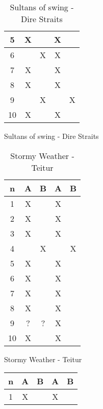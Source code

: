 \begin{figure}[H]
\begin{subfigure}[t]{0.20\textwidth}
\begin{table}[H]
\begin{tabular}{ccccc}
5         & X        &          & X       &         \\ \hline
6         &          & X        & X       &         \\
7         & X        &          & X       &         \\
8         & X        &          & X       &         \\
9         &          & X        &         & X       \\
10        & X        &          & X       &         \\ \bottomrule 
\end{tabular}
\caption{Sultans of swing - Dire Straits}
\label{tab:Sultansofswing}
\end{table}
\end{subfigure}
\hfill
\begin{subfigure}[t]{0.20\textwidth}
\begin{table}[H]
\centering
\begin{tabular}{ccccc}
n       & A      & B      & A      & B      \\ \bottomrule
1       & X      &        & X      &        \\
2       & X      &        & X      &        \\
3       & X      &        & X      &        \\
4       &        & X      &        & X      \\ 
5       & X      &        & X      &        \\ \hline
6       & X      &        & X      &        \\
7       & X      &        & X      &        \\
8       & X      &        & X      &        \\
9       & ?      & ?      & X      &        \\
10      & X      &        & X      &        \\ \bottomrule
\end{tabular}
\caption{Stormy Weather - Teitur}
\label{tab:stormyweather}
\end{table}
\end{subfigure}
\hfill
\begin{subfigure}[t]{0.20\textwidth}
\begin{table}[H]
\centering
\begin{tabular}{ccccc}
n          & A         & B         & A         & B        \\ \bottomrule
1          & X         &           & X         &          \\

\end{tabular}
\end{table}
\end{subfigure}
\end{figure}
